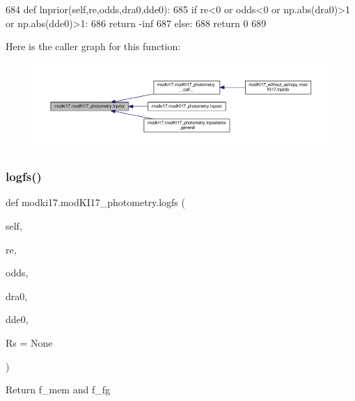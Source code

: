 \begin{DoxyCode}
684     \textcolor{keyword}{def }lnprior(self,re,odds,dra0,dde0):
685         \textcolor{keywordflow}{if} re<0 \textcolor{keywordflow}{or} odds<0 \textcolor{keywordflow}{or} np.abs(dra0)>1 \textcolor{keywordflow}{or} np.abs(dde0)>1:
686             \textcolor{keywordflow}{return} -inf
687         \textcolor{keywordflow}{else}:
688             \textcolor{keywordflow}{return} 0
689     
\end{DoxyCode}
Here is the caller graph for this function\+:\nopagebreak
\begin{figure}[H]
\begin{center}
\leavevmode
\includegraphics[width=350pt]{dd/db2/classmodki17_1_1modKI17__photometry_a857286f3245038e653c739b35c4988e8_icgraph}
\end{center}
\end{figure}
\mbox{\label{classmodki17_1_1modKI17__photometry_a2d4b3707792c8c224068ad6715d42545}} 
\subsubsection{\texorpdfstring{logfs()}{logfs()}}
{\footnotesize\ttfamily def modki17.\+mod\+K\+I17\+\_\+photometry.\+logfs (\begin{DoxyParamCaption}\item[{}]{self,  }\item[{}]{re,  }\item[{}]{odds,  }\item[{}]{dra0,  }\item[{}]{dde0,  }\item[{}]{Rs = {\ttfamily None} }\end{DoxyParamCaption})}

\begin{DoxyVerb}Return f_mem and f_fg
\end{DoxyVerb}
 

